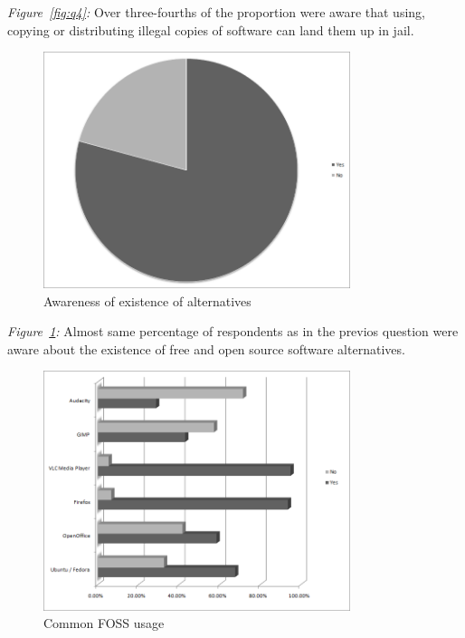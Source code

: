 \emph{Figure~\ref{fig:q4}:} Over three-fourths of the proportion were aware that using, copying or distributing illegal copies of software can land them up in jail.

\newpage
\begin{figure}[h!]
\centering
\includegraphics[width=0.8\textwidth]{./q5.png}
\caption{Awareness of existence of alternatives}
\label{fig:q5}
\end{figure}

\emph{Figure~\ref{fig:q5}:} Almost same percentage of respondents as in the previos question were aware about the existence of free and open source software alternatives.

\newpage
\begin{figure}[h!]
\centering
\includegraphics[width=0.8\textwidth]{./q6.png}
\caption{Common FOSS usage}
\label{fig:q6}
\end{figure}


